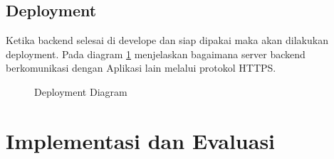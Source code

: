 \subsection{Deployment}
Ketika backend selesai di develope dan siap dipakai maka akan dilakukan deployment.
Pada diagram \ref{deployment} menjelaskan bagaimana server backend berkomunikasi dengan Aplikasi lain melalui protokol HTTPS. 

\begin{figure}[h]
	{\par}
	\caption{Deployment Diagram}
	\label{deployment}
\end{figure}


\section{Implementasi dan Evaluasi}

